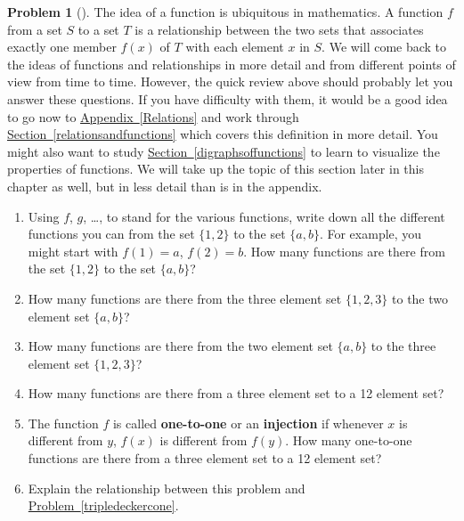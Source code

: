 \documentclass[10pt,]{book}
\newcommand{\terminology}[1]{\textbf{#1}}
\theoremstyle{plain}
\theoremstyle{definition}
\newtheorem{activity}[project]{Problem}
\theoremstyle{definition}
\numberwithin{equation}{chapter}
\begin{document}
\begin{activity}[] \label{countingfunctions}
The idea of a function is ubiquitous in mathematics. A function \(f\) from a set \(S\) to a set \(T\) is a relationship between the two sets that associates exactly one member \(f(x)\) of \(T\) with each element \(x\) in \(S\). We will come back to the ideas of functions and relationships in more detail and from different points of view from time to time. However, the quick review above should probably let you answer these questions. If you have difficulty with them, it would be a good idea to go now to \hyperref[Relations]{Appendix~\ref{Relations}} and work through \hyperref[relationsandfunctions]{Section~\ref{relationsandfunctions}} which covers this definition in more detail. You might also want to study \hyperref[digraphsoffunctions]{Section~\ref{digraphsoffunctions}} to learn to visualize the properties of functions. We will take up the topic of this section later in this chapter as well, but in less detail than is in the appendix.%
\begin{enumerate}[font=\bfseries,label=(\alph*),ref=\alph*]
\item\label{countingfunctionsparta} \marginsymbol[-2.5em]{} Using \(f\), \(g\), \dots{}, to stand for the various functions, write down all the different functions you can from the set \(\{1,2\}\) to the set \(\{a,b\}\).  For example, you might start with \(f(1)=a\), \(f(2)=b\).  How many functions are there from the set \(\{1,2\}\) to the set \(\{a,b\}\)?%
\item\label{task-6} \marginsymbol[-2.5em]{} How many functions are there from the three element set \(\{1,2,3\}\) to the two element set \(\{a,b\}\)?%
\item\label{task-7} \marginsymbol[-2.5em]{} How many functions are there from the two element set \(\{a,b\}\) to the three element set \(\{1,2,3\}\)?%
\item\label{task-8} \marginsymbol[-2.5em]{} How many functions are there from a three element set to a 12 element set?%
\item\label{task-9} \marginsymbol[-2.5em]{} The function \(f\) is called \terminology{one-to-one} or an \terminology{injection} if whenever \(x\) is different from \(y\), \(f(x)\) is different from \(f(y)\).  How many one-to-one functions are there from a three element set to a  12 element set?%
\item\label{task-10} \marginsymbol[-2.5em]{} Explain the relationship between this problem and \hyperref[tripledeckercone]{Problem~\ref{tripledeckercone}}.%
\end{enumerate}
\end{activity}
\end{document}
